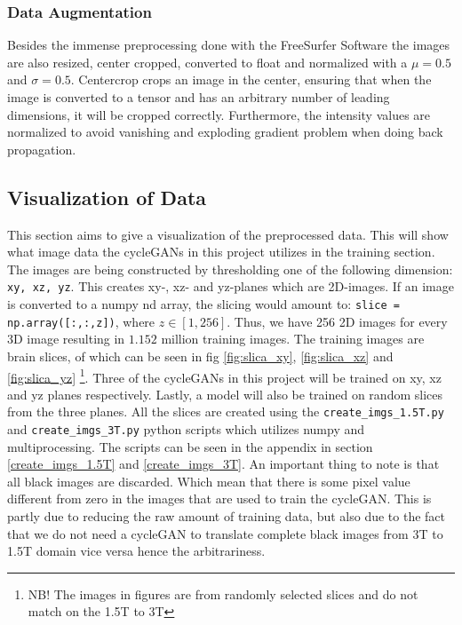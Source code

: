 \documentclass[12pt, fleqn, titlepage]{article}
\begin{document}


\subsubsection{Data Augmentation}

Besides the immense preprocessing done with the FreeSurfer Software the images are also resized, center cropped, converted to float and normalized with a $ \mu = 0.5 $ and $ \sigma = 0.5$. Centercrop crops an image in the center, ensuring that when the image is converted to a tensor and has an arbitrary number of leading dimensions, it will be cropped correctly. Furthermore, the intensity values are normalized to avoid vanishing and exploding gradient problem when doing back propagation. 


\subsection{Visualization of Data}
This section aims to give a visualization of the preprocessed data. This will show what image data the cycleGANs in this project utilizes in the training section. The images are being constructed by thresholding one of the following dimension: \texttt{xy, xz, yz}. This creates xy-, xz- and yz-planes which are 2D-images. If an image is converted to a numpy nd array, the slicing would amount to: \texttt{slice = np.array([:,:,z])}, where $ z \in [1,256] $. Thus, we have 256 2D images for every 3D image resulting in $ 1.152 $ million training images. The training images are brain slices, of which can be seen in fig \ref{fig:slica_xy}, \ref{fig:slica_xz} and \ref{fig:slica_yz} \footnote{NB! The images in figures are from randomly selected slices and do not match on the 1.5T to 3T}. Three of the cycleGANs in this project will be trained on xy, xz and yz planes respectively. Lastly, a model will also be trained on random slices from the three planes. All the slices are created using the \texttt{create\_imgs\_1.5T.py} and \texttt{create\_imgs\_3T.py} python scripts which utilizes numpy and multiprocessing. The scripts can be seen in the appendix in section \ref{create_imgs_1.5T} and \ref{create_imgs_3T}.
An important thing to note is that all black images are discarded. Which mean that there is some pixel value different from zero in the images that are used to train the cycleGAN. This is partly due to reducing the raw amount of training data, but also due to the fact that we do not need a cycleGAN to translate complete black images from 3T to 1.5T domain vice versa hence the arbitrariness. 
\end{document}
